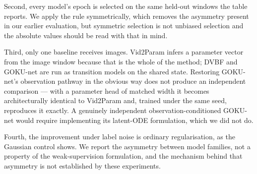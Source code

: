 Second, every model's epoch is selected on the same held-out windows the table
reports. We apply the rule symmetrically, which removes the asymmetry present in
our earlier evaluation, but symmetric selection is not unbiased selection and
the absolute values should be read with that in mind.

Third, only one baseline receives images. Vid2Param infers a parameter vector
from the image window because that is the whole of the method; DVBF and GOKU-net
are run as transition models on the shared state. Restoring GOKU-net's
observation pathway in the obvious way does not produce an independent
comparison --- with a parameter head of matched width it becomes architecturally
identical to Vid2Param and, trained under the same seed, reproduces it exactly.
A genuinely independent observation-conditioned GOKU-net would require
implementing its latent-ODE formulation, which we did not do.

Fourth, the improvement under label noise is ordinary regularisation, as the
Gaussian control shows. We report the asymmetry between model families, not a
property of the weak-supervision formulation, and the mechanism behind that
asymmetry is not established by these experiments.

